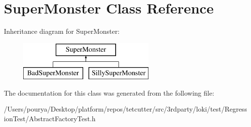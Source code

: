 \hypertarget{classSuperMonster}{}\section{Super\+Monster Class Reference}
\label{classSuperMonster}
Inheritance diagram for Super\+Monster\+:\begin{figure}[H]
\begin{center}
\leavevmode
\includegraphics[height=2.000000cm]{classSuperMonster}
\end{center}
\end{figure}


The documentation for this class was generated from the following file\+:\begin{DoxyCompactItemize}
\item 
/\+Users/pourya/\+Desktop/platform/repos/tetcutter/src/3rdparty/loki/test/\+Regression\+Test/Abstract\+Factory\+Test.\+h\end{DoxyCompactItemize}
